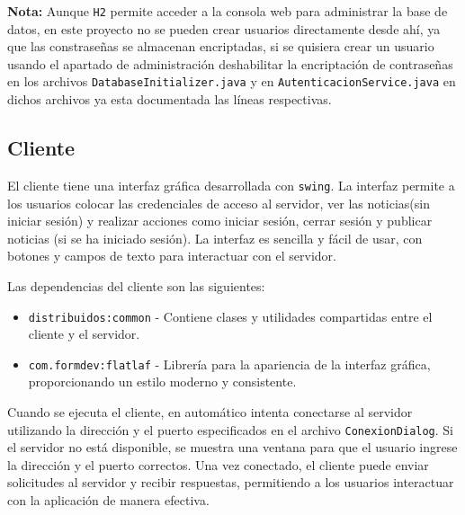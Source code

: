 \textbf{\color{BrandRed}Nota:} Aunque \texttt{H2} permite acceder a la consola web para administrar la base de datos, en este proyecto no se pueden crear usuarios directamente desde ahí, ya que las constraseñas se almacenan encriptadas, si se quisiera crear un usuario usando el apartado de administración deshabilitar la encriptación de contraseñas en los archivos \texttt{DatabaseInitializer.java} y en \texttt{AutenticacionService.java} en dichos archivos  ya esta documentada las líneas respectivas.

\subsection{Cliente}

El cliente tiene una interfaz gráfica desarrollada con \texttt{swing}. La interfaz permite a los usuarios colocar las credenciales de acceso al servidor, ver las noticias(sin iniciar sesión) y realizar acciones como iniciar sesión, cerrar sesión y publicar noticias (si se ha iniciado sesión). La interfaz es sencilla y fácil de usar, con botones y campos de texto para interactuar con el servidor.

Las dependencias del cliente son las siguientes:
\begin{itemize}
    \item \texttt{distribuidos:common} - Contiene clases y utilidades compartidas entre el cliente y el servidor.
    \item \texttt{com.formdev:flatlaf} - Librería para la apariencia de la interfaz gráfica, proporcionando un estilo moderno y consistente.
\end{itemize}

Cuando se ejecuta el cliente, en automático intenta conectarse al servidor utilizando la dirección y el puerto especificados en el archivo \texttt{ConexionDialog}. Si el servidor no está disponible, se muestra una ventana para que el usuario ingrese la dirección y el puerto correctos. Una vez conectado, el cliente puede enviar solicitudes al servidor y recibir respuestas, permitiendo a los usuarios interactuar con la aplicación de manera efectiva.



